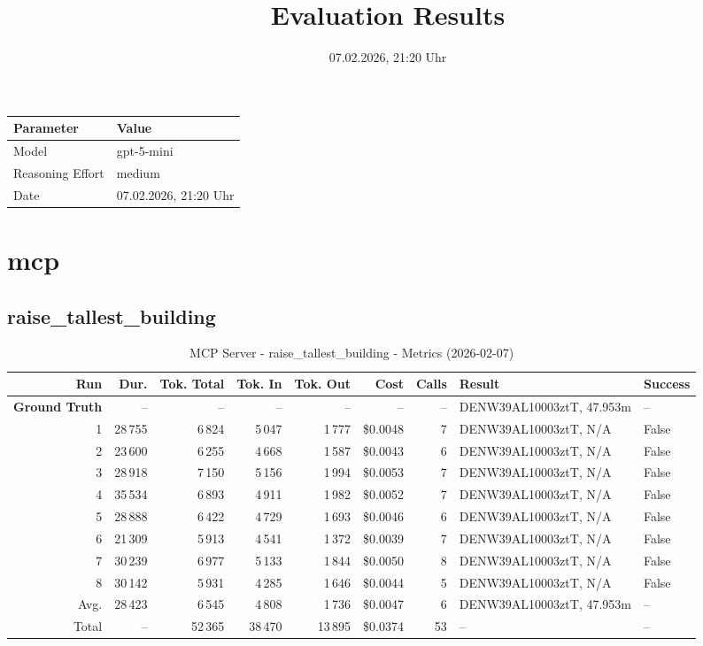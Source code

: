 \documentclass[a4paper,11pt]{article}
\title{Evaluation Results}
\date{07.02.2026, 21:20 Uhr}
\begin{document}
\maketitle

\begin{table}[H]
\centering
\begin{tabular}{l l}
\toprule
\textbf{Parameter} & \textbf{Value} \\
\midrule
Model & gpt-5-mini \\
Reasoning Effort & medium \\
Date & 07.02.2026, 21:20 Uhr \\
\bottomrule
\end{tabular}
\end{table}

\tableofcontents
\clearpage

\section{mcp}

\subsection{raise\_tallest\_building}

\begin{table}[ht]
\centering
\scriptsize
\caption{MCP Server - raise\_tallest\_building - Metrics (2026-02-07)}
\label{tab:mcp\_raise\_tallest\_building\_metrics\_2026-02-07}
\begin{tabular}{r r r r r r r p{3cm} l}
\hline
Run & Dur. & Tok. Total & Tok. In & Tok. Out & Cost & Calls & Result & Success \\
\hline
\textbf{Ground Truth} & -- & -- & -- & -- & -- & -- & DENW39AL10003ztT, 47.953m & -- \\
\hline
1 & 28\,755 & 6\,824 & 5\,047 & 1\,777 & \$0.0048 & 7 & DENW39AL10003ztT, N/A & False \\
2 & 23\,600 & 6\,255 & 4\,668 & 1\,587 & \$0.0043 & 6 & DENW39AL10003ztT, N/A & False \\
3 & 28\,918 & 7\,150 & 5\,156 & 1\,994 & \$0.0053 & 7 & DENW39AL10003ztT, N/A & False \\
4 & 35\,534 & 6\,893 & 4\,911 & 1\,982 & \$0.0052 & 7 & DENW39AL10003ztT, N/A & False \\
5 & 28\,888 & 6\,422 & 4\,729 & 1\,693 & \$0.0046 & 6 & DENW39AL10003ztT, N/A & False \\
6 & 21\,309 & 5\,913 & 4\,541 & 1\,372 & \$0.0039 & 7 & DENW39AL10003ztT, N/A & False \\
7 & 30\,239 & 6\,977 & 5\,133 & 1\,844 & \$0.0050 & 8 & DENW39AL10003ztT, N/A & False \\
8 & 30\,142 & 5\,931 & 4\,285 & 1\,646 & \$0.0044 & 5 & DENW39AL10003ztT, N/A & False \\
\hline
Avg. & 28\,423 & 6\,545 & 4\,808 & 1\,736 & \$0.0047 & 6 & DENW39AL10003ztT, 47.953m & -- \\
Total & -- & 52\,365 & 38\,470 & 13\,895 & \$0.0374 & 53 & -- & -- \\
\hline
\end{tabular}
\end{table}
\end{document}
